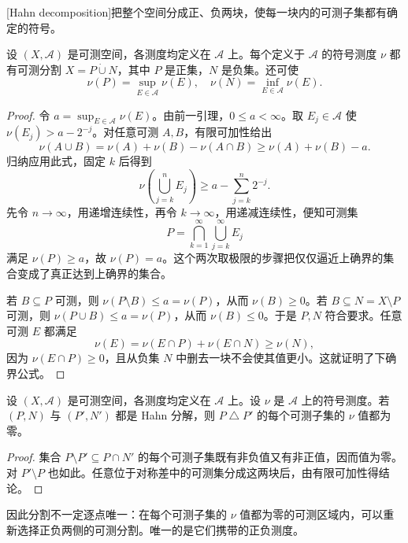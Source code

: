 [Hahn decomposition]把整个空间分成正、负两块，使每一块内的可测子集都有确定的符号。

\begin{theorem}[Hahn 分解]\label{b1:thm:hahn-decomposition}
设 \((X,\mathcal A)\) 是可测空间，各测度均定义在 \(\mathcal A\) 上。每个定义于 \(\mathcal A\) 的符号测度 \(\nu\) 都有可测分割 \(X=P\mathbin{\dot\cup}N\)，其中 \(P\) 是正集，\(N\) 是负集。还可使
\[
\nu(P)=\sup_{E\in\mathcal A}\nu(E),\quad
\nu(N)=\inf_{E\in\mathcal A}\nu(E).
\]
\end{theorem}
\begin{proof}
令 \(a=\sup_{E\in\mathcal A}\nu(E)\)。由前一引理，\(0\leq a<\infty\)。取 \(E_j\in\mathcal A\) 使 \(\nu(E_j)>a-2^{-j}\)。对任意可测 \(A,B\)，有限可加性给出
\[
\nu(A\cup B)=\nu(A)+\nu(B)-\nu(A\cap B)
\geq\nu(A)+\nu(B)-a.
\]
归纳应用此式，固定 \(k\) 后得到
\[
\nu\left(\bigcup_{j=k}^{n}E_j\right)
\geq a-\sum_{j=k}^{n}2^{-j}.
\]
先令 \(n\rightarrow\infty\)，用递增连续性，再令 \(k\rightarrow\infty\)，用递减连续性，便知可测集
\[
P=\bigcap_{k=1}^{\infty}\bigcup_{j=k}^{\infty}E_j
\]
满足 \(\nu(P)\geq a\)，故 \(\nu(P)=a\)。这个两次取极限的步骤把仅仅逼近上确界的集合变成了真正达到上确界的集合。

若 \(B\subseteq P\) 可测，则 \(\nu(P\setminus B)\leq a=\nu(P)\)，从而 \(\nu(B)\geq0\)。若 \(B\subseteq N=X\setminus P\) 可测，则 \(\nu(P\cup B)\leq a=\nu(P)\)，从而 \(\nu(B)\leq0\)。于是 \(P,N\) 符合要求。任意可测 \(E\) 都满足
\[
\nu(E)=\nu(E\cap P)+\nu(E\cap N)\geq\nu(N),
\]
因为 \(\nu(E\cap P)\geq0\)，且从负集 \(N\) 中删去一块不会使其值更小。这就证明了下确界公式。
\end{proof}

\begin{proposition}\label{b1:prop:hahn-essential-uniqueness}
设 \((X,\mathcal A)\) 是可测空间，各测度均定义在 \(\mathcal A\) 上。设 \(\nu\) 是 \(\mathcal A\) 上的符号测度。若 \((P,N)\) 与 \((P',N')\) 都是 Hahn 分解，则 \(P\mathbin{\triangle}P'\) 的每个可测子集的 \(\nu\) 值都为零。
\end{proposition}
\begin{proof}
集合 \(P\setminus P'\subseteq P\cap N'\) 的每个可测子集既有非负值又有非正值，因而值为零。对 \(P'\setminus P\) 也如此。任意位于对称差中的可测集分成这两块后，由有限可加性得结论。
\end{proof}

因此分割不一定逐点唯一：在每个可测子集的 \(\nu\) 值都为零的可测区域内，可以重新选择正负两侧的可测分割。唯一的是它们携带的正负测度。

